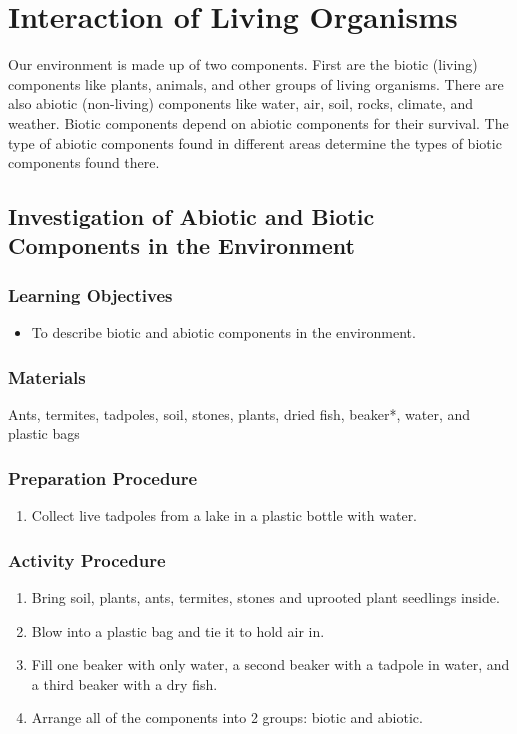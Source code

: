 \section{Interaction of Living Organisms}
Our environment is made up of two components. First are the biotic (living) components like plants, animals, and other groups of living organisms. There are also abiotic (non-living) components like water, air, soil, rocks, climate, and weather. Biotic components depend on abiotic components for their survival. The type of abiotic components found in different areas determine the types of biotic components found there.

\subsection{Investigation of Abiotic and Biotic Components in the Environment}

\subsubsection*{Learning Objectives}
\begin{itemize}
\item{To describe biotic and abiotic components in the environment.}
\end{itemize}

\subsubsection*{Materials}
Ants, termites, tadpoles, soil, stones, plants, dried fish, beaker*, water, and plastic bags

\subsubsection*{Preparation Procedure}
\begin{enumerate}
\item{Collect live tadpoles from a lake in a plastic bottle with water.}
\end{enumerate}

\subsubsection*{Activity Procedure}
\begin{enumerate}
\item{Bring soil, plants, ants, termites, stones and uprooted plant seedlings inside.}
\item{Blow into a plastic bag and tie it to hold air in.}
\item{Fill one beaker with only water, a second beaker with a tadpole in water, and a third beaker with a dry fish.}
\item{Arrange all of the components into 2 groups: biotic and abiotic.}
\end{enumerate}

